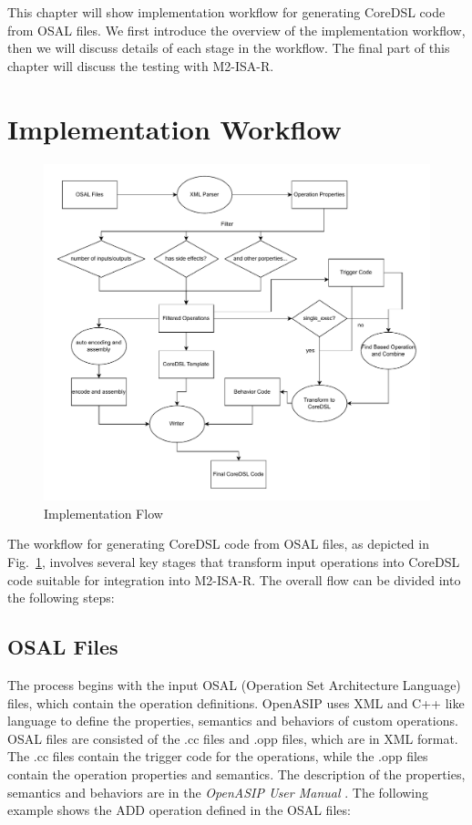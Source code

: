 This chapter will show implementation workflow for generating CoreDSL code from OSAL files. We first introduce the overview of the implementation workflow, then we will discuss details of each stage in the workflow. The final part of this chapter will discuss the testing with M2-ISA-R.

\section{Implementation Workflow}

\begin{figure}[ht]
\centering
\includegraphics[width=\linewidth]{figures/flow.pdf}
\caption{Implementation Flow}
\label{fig:flow}
\end{figure}

The workflow for generating CoreDSL code from OSAL files, as depicted in Fig.~\ref{fig:flow}, involves several key stages that transform input operations into CoreDSL code suitable for integration into M2-ISA-R. The overall flow can be divided into the following steps:

\subsection{OSAL Files}
The process begins with the input OSAL (Operation Set Architecture Language) files, which contain the operation definitions. OpenASIP uses XML and C++ like language to define the properties, semantics and behaviors of custom operations. OSAL files are consisted of the .cc files and .opp files, which are in XML format. The .cc files contain the trigger code for the operations, while the .opp files contain the operation properties and semantics. The description of the properties, semantics and behaviors are in the \textit{OpenASIP User Manual} \cite{openasipmanual}. The following example shows the ADD operation defined in the OSAL files:

